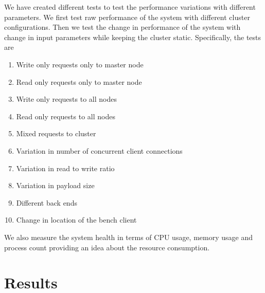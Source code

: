 We have created different tests to test the performance variations with
different parameters. We first test raw performance of the system with
different cluster configurations. Then we test the change in performance
of the system with change in input parameters while keeping the cluster
static. Specifically, the tests are

\begin{enumerate}[1.]
  \item Write only requests only to master node
  \item Read only requests only to master node
  \item Write only requests to all nodes
  \item Read only requests to all nodes
  \item Mixed requests to cluster
  \item Variation in number of concurrent client connections
  \item Variation in read to write ratio
  \item Variation in payload size
  \item Different back ends
  \item Change in location of the bench client
\end{enumerate}

We also measure the system health in terms of CPU usage, memory usage and
process count providing an idea about the resource consumption.








\section{Results}

